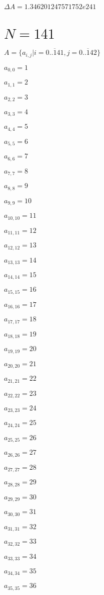 \documentclass[a4paper,12pt]{article}
\begin{document}
$\Delta A = 1.346201247571752e241$



\section{ $N = 141$ }
$A = \{ a _{ i, j } | i = \overline { 0..141 }, j = \overline { 0..142 } \}$

$a _{ 0, 0 } = 1$

$a _{ 1, 1 } = 2$

$a _{ 2, 2 } = 3$

$a _{ 3, 3 } = 4$

$a _{ 4, 4 } = 5$

$a _{ 5, 5 } = 6$

$a _{ 6, 6 } = 7$

$a _{ 7, 7 } = 8$

$a _{ 8, 8 } = 9$

$a _{ 9, 9 } = 10$

$a _{ 10, 10 } = 11$

$a _{ 11, 11 } = 12$

$a _{ 12, 12 } = 13$

$a _{ 13, 13 } = 14$

$a _{ 14, 14 } = 15$

$a _{ 15, 15 } = 16$

$a _{ 16, 16 } = 17$

$a _{ 17, 17 } = 18$

$a _{ 18, 18 } = 19$

$a _{ 19, 19 } = 20$

$a _{ 20, 20 } = 21$

$a _{ 21, 21 } = 22$

$a _{ 22, 22 } = 23$

$a _{ 23, 23 } = 24$

$a _{ 24, 24 } = 25$

$a _{ 25, 25 } = 26$

$a _{ 26, 26 } = 27$

$a _{ 27, 27 } = 28$

$a _{ 28, 28 } = 29$

$a _{ 29, 29 } = 30$

$a _{ 30, 30 } = 31$

$a _{ 31, 31 } = 32$

$a _{ 32, 32 } = 33$

$a _{ 33, 33 } = 34$

$a _{ 34, 34 } = 35$

$a _{ 35, 35 } = 36$
\end{document}
